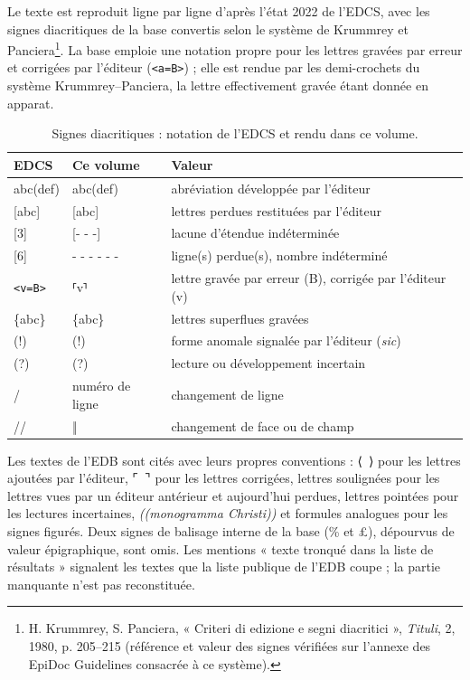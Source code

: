Le texte est reproduit ligne par ligne d’après l’état 2022 de l’EDCS, avec les signes diacritiques de la base convertis selon le système de Krummrey et Panciera\footnote{H. Krummrey, S. Panciera, « Criteri di edizione e segni diacritici », \emph{Tituli}, 2, 1980, p. 205–215 (référence et valeur des signes vérifiées sur l’annexe des EpiDoc Guidelines consacrée à ce système).}. La base emploie une notation propre pour les lettres gravées par erreur et corrigées par l’éditeur (\texttt{<a=B>}) ; elle est rendue par les demi-crochets du système Krummrey–Panciera, la lettre effectivement gravée étant donnée en apparat.

\begin{table}[tbp]\centering\small
\caption{Signes diacritiques : notation de l’EDCS et rendu dans ce volume.}\label{tab:signes}
\begin{tabular}{@{}l l l@{}}\toprule EDCS & Ce volume & Valeur\\\midrule
abc(def) & abc(def) & abréviation développée par l’éditeur\\
{[}abc{]} & {[}abc{]} & lettres perdues restituées par l’éditeur\\
{[}3{]} & {[}- - -{]} & lacune d’étendue indéterminée\\
{[}6{]} & - - - - - - & ligne(s) perdue(s), nombre indéterminé\\
\texttt{<v=B>} & ⸢v⸣ & lettre gravée par erreur (B), corrigée par l’éditeur (v)\\
\{abc\} & \{abc\} & lettres superflues gravées\\
(!) & (!) & forme anomale signalée par l’éditeur (\emph{sic})\\
(?) & (?) & lecture ou développement incertain\\
/ & numéro de ligne & changement de ligne\\
// & ‖ & changement de face ou de champ\\\bottomrule
\end{tabular}
\end{table}

Les textes de l’EDB sont cités avec leurs propres conventions : ⟨~⟩ pour les lettres ajoutées par l’éditeur, ⌜~⌝ pour les lettres corrigées, lettres soulignées pour les lettres vues par un éditeur antérieur et aujourd’hui perdues, lettres pointées pour les lectures incertaines, \emph{((monogramma Christi))} et formules analogues pour les signes figurés. Deux signes de balisage interne de la base (\% et £), dépourvus de valeur épigraphique, sont omis. Les mentions « texte tronqué dans la liste de résultats » signalent les textes que la liste publique de l’EDB coupe ; la partie manquante n’est pas reconstituée.

